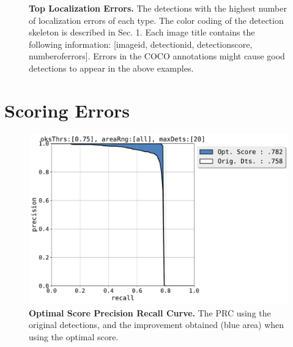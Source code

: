 \documentclass[10pt,onecolumn,letterpaper]{article}
\begin{document}
\begin{figure}[h!]
{\begin{tabular}{c|c|c|c}
\end{tabular}
}
\vspace{-4mm}
\caption{ {\small \textbf{Top Localization Errors.} The detections with the highest number of localization errors of each type.
The color coding of the detection skeleton is described in Sec. 1. Each image title contains the following information:
[image\textunderscore id, detection\textunderscore id, detection\textunderscore score, number\textunderscore of\textunderscore errors].
Errors in the COCO annotations might cause good detections to appear in the above examples.}}
\end{figure}

\clearpage

\section{Scoring Errors}

\begin{figure}[h!]
\centering
\includegraphics[width=.5\linewidth]{./result/rmpe/scoring_errors/error_prc_[scoring][75][all][20].pdf}
\caption{ {\small \textbf{Optimal Score Precision Recall Curve.}
The PRC using the original detections, and the improvement obtained (blue area) when using the optimal score.}}
\end{figure}
\end{document}
